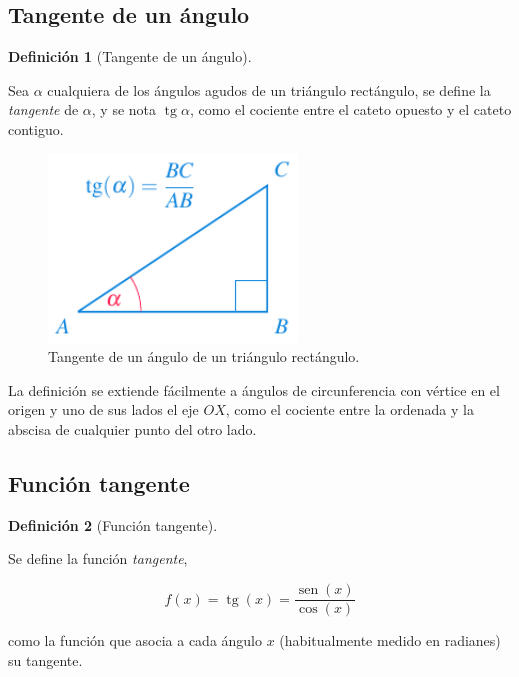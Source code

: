 \documentclass[
  a4paper,
]{scrreport}
\theoremstyle{definition}
\theoremstyle{plain}
\theoremstyle{definition}
\newtheorem{definition}{Definición}[chapter]
\theoremstyle{definition}
\theoremstyle{plain}
\theoremstyle{plain}
\theoremstyle{remark}
\begin{document}
\subsection{Tangente de un ángulo}\label{tangente-de-un-uxe1ngulo}

\begin{definition}[Tangente de un
ángulo]\protect\hypertarget{def-tangente-angulo}{}\label{def-tangente-angulo}

Sea \(\alpha\) cualquiera de los ángulos agudos de un triángulo
rectángulo, se define la \emph{tangente} de \(\alpha\), y se nota
\(\operatorname{tg} \alpha\), como el cociente entre el cateto opuesto y
el cateto contiguo.

\end{definition}

\begin{figure}[H]

{\centering \includegraphics[width=2.60417in,height=\textheight]{./img/funciones/tangente-triangulo.pdf}

}

\caption{Tangente de un ángulo de un triángulo rectángulo.}

\end{figure}%

La definición se extiende fácilmente a ángulos de circunferencia con
vértice en el origen y uno de sus lados el eje \(OX\), como el cociente
entre la ordenada y la abscisa de cualquier punto del otro lado.

\subsection{Función tangente}\label{funciuxf3n-tangente}

\begin{definition}[Función
tangente]\protect\hypertarget{def-funcion-tangente}{}\label{def-funcion-tangente}

Se define la función \emph{tangente},

\[f(x)=\operatorname{tg}(x)=\frac{\operatorname{sen}(x)}{\cos(x)}\]

como la función que asocia a cada ángulo \(x\) (habitualmente medido en
radianes) su tangente.

\end{definition}
\end{document}
